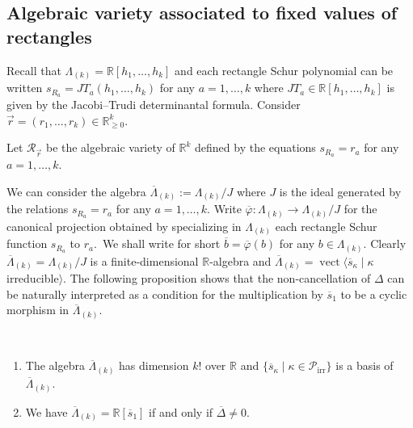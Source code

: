 \documentclass[ALCO,ThmDefs,Unicode,epreuves]{cedram}
\DeclareMathOperator{\irr}{irr}
\DeclareMathOperator{\vect}{vect}
\begin{document}
\subsection{Algebraic variety associated to fixed values of rectangles}

Recall that $\Lambda_{(k)}=\mathbb{R}[h_{1},\ldots,h_{k}]$ and each rectangle
Schur polynomial can be written $s_{R_{a}}=JT_{a}(h_{1},\ldots,h_{k})$ for any
$a=1,\ldots,k$ where $JT_{a}\in\mathbb{R}[h_{1},\ldots,h_{k}]$ is given by the
Jacobi--Trudi determinantal formula. Consider $\vec{r}=(r_{1},\ldots,r_{k}%
)\in\mathbb{R}_{\geq0}^{k}$.

\begin{defi}
\label{Def_Variety}Let $\mathcal{R}_{\vec{r}}$ be the algebraic variety of
$\mathbb{R}^{k}$ defined by the equations $s_{R_{a}}=r_{a}$ for any
$a=1,\ldots,k$.
\end{defi}

We can consider the algebra $\overline{\Lambda}_{(k)}:=\Lambda_{(k)}/J$ where
$J$ is the ideal generated by the relations $s_{R_{a}}=r_{a}$ for any
$a=1,\ldots,k$. Write $\overline{\varphi}:\Lambda_{(k)}\rightarrow
\Lambda_{(k)}/J$ for the canonical projection obtained by specializing in
$\Lambda_{(k)}$ each rectangle Schur function $s_{R_{a}}$ to $r_{a}$.\ We
shall write for short $\overline{b}=\overline{\varphi}(b)$ for any
$b\in\Lambda_{(k)}$. Clearly $\overline{\Lambda}_{(k)}=\Lambda_{(k)}/J$ is a
finite-dimensional $\mathbb{R}$-algebra and $\overline{\Lambda}_{(k)}%
=\vect \langle\overline{s}_{\kappa}\mid\kappa$ irreducible$\rangle$.
The following proposition shows that the non-cancellation of $\Delta$ can be
naturally interpreted as a condition for the multiplication by $\overline
{s}_{1}$ to be a cyclic morphism in $\overline{\Lambda}_{(k)}$.

\begin{prop}
\label{primitive_Specialization} \ 

\begin{enumerate}
\item\label{prop4.11_1} The algebra $\overline{\Lambda}_{(k)}$ has dimension $k!$ over
$\mathbb{R}$ and $\{\overline{s}_{\kappa}\mid\kappa\in\mathcal{P}%
_{\irr }\}$ is a basis of $\overline{\Lambda}_{(k)}$.

\item\label{prop4.11_2} We have $\overline{\Lambda}_{(k)}=\mathbb{R}[\overline{s}_{1}]$ if and
only if $\overline{\Delta}\neq0$.
\end{enumerate}
\end{prop}
\end{document}
